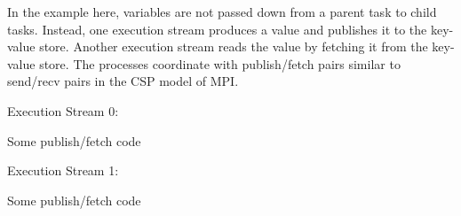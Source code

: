 In the example here, variables are not passed down from a parent task to child tasks.
Instead, one execution stream produces a value and publishes it to the key-value store.
Another execution stream reads the value by fetching it from the key-value store.
The processes coordinate with publish/fetch pairs similar to send/recv pairs in the CSP model of MPI.

\begin{minipage}{0.45\textwidth}
Execution Stream 0:
\begin{CppCode}
Some publish/fetch code
\end{CppCode}
\end{minipage}
\begin{minipage}{0.45\textwidth}
Execution Stream 1:
\begin{CppCode}
Some publish/fetch code
\end{CppCode}
\end{minipage}

%
%
%
%
%
%
%
%

